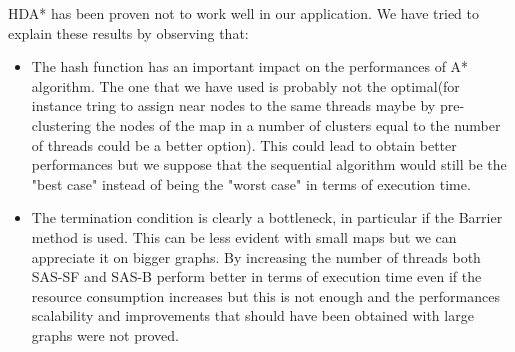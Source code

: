\documentclass[twocolumn, switch]{article} %
\begin{document}
HDA* has been proven not to work well in our application. We have tried to explain these 
results by observing that:
\begin{itemize}
  \item The hash function has an important impact on the performances of A* algorithm. The one that
        we have used is probably not the optimal(for instance tring to assign near nodes
        to the same threads maybe by pre-clustering the nodes of the map in a number of clusters
        equal to the number of threads could be a better option). This could lead to obtain better performances but we
        suppose that the sequential algorithm would still be the "best case" instead of being the "worst case"
        in terms of execution time. 
  \item The termination condition is clearly a bottleneck, in particular if the Barrier method
        is used. This can be less evident with small maps but we can appreciate it on bigger graphs.
        By increasing the number of threads both SAS-SF and SAS-B perform better in terms of execution time even if
        the resource consumption increases but this is not enough and the performances scalability
        and improvements that should have been obtained with large graphs were not proved.
\end{itemize}
\end{document}
